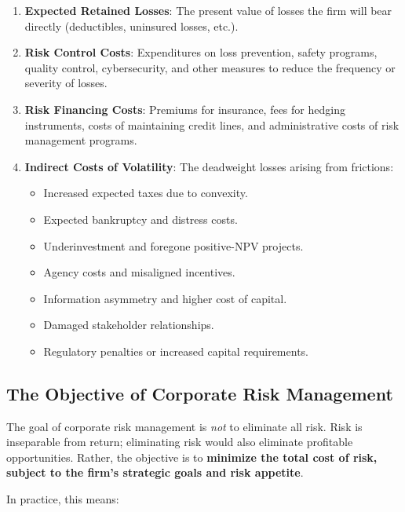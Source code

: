 \documentclass[11pt,openany]{book}
\providecommand{\tightlist}{\setlength{\itemsep}{0pt}\setlength{\parskip}{0pt}}
\begin{document}
\begin{enumerate}
\def\labelenumi{\arabic{enumi}.}
\item
  \textbf{Expected Retained Losses}: The present value of losses the firm will bear directly (deductibles, uninsured losses, etc.).
\item
  \textbf{Risk Control Costs}: Expenditures on loss prevention, safety programs, quality control, cybersecurity, and other measures to reduce the frequency or severity of losses.
\item
  \textbf{Risk Financing Costs}: Premiums for insurance, fees for hedging instruments, costs of maintaining credit lines, and administrative costs of risk management programs.
\item
  \textbf{Indirect Costs of Volatility}: The deadweight losses arising from frictions:

  \begin{itemize}
  \tightlist
  \item
    Increased expected taxes due to convexity.
  \item
    Expected bankruptcy and distress costs.
  \item
    Underinvestment and foregone positive-NPV projects.
  \item
    Agency costs and misaligned incentives.
  \item
    Information asymmetry and higher cost of capital.
  \item
    Damaged stakeholder relationships.
  \item
    Regulatory penalties or increased capital requirements.
  \end{itemize}
\end{enumerate}

\subsection{The Objective of Corporate Risk Management}\label{the-objective-of-corporate-risk-management}

The goal of corporate risk management is \emph{not} to eliminate all risk. Risk is inseparable from return; eliminating risk would also eliminate profitable opportunities. Rather, the objective is to \textbf{minimize the total cost of risk, subject to the firm's strategic goals and risk appetite}.

In practice, this means:
\end{document}
